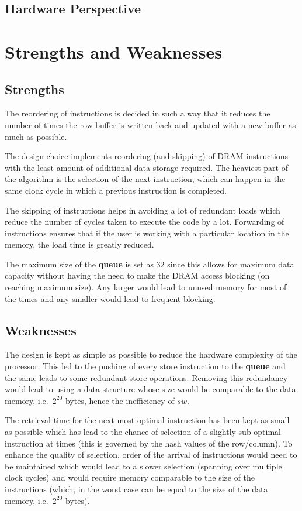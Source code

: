 \documentclass{article}
\begin{document}
\subsection{Hardware Perspective}


\section{Strengths and Weaknesses}


\subsection{Strengths}
The reordering of instructions is decided in such a way that it reduces the number of times the row buffer is written back and updated with a new buffer as much as possible.\par
The design choice implements reordering (and skipping) of DRAM instructions with the least amount of additional data storage required. The heaviest part of the algorithm is the selection of the next instruction, which can happen in the same clock cycle in which a previous instruction is completed.\par
The skipping of instructions helps in avoiding a lot of redundant loads which reduce the number of cycles taken to execute the code by a lot. Forwarding of instructions ensures that if the user is working with a particular location in the memory, the load time is greatly reduced.\par
The maximum size of the \textbf{queue} is set as $32$ since this allows for maximum data capacity without having the need to make the DRAM access blocking (on reaching maximum size). Any larger would lead to unused memory for most of the times and any smaller would lead to frequent blocking.

\subsection{Weaknesses}
The design is kept as simple as possible to reduce the hardware complexity of the processor. This led to the pushing of every store instruction to the \textbf{queue} and the same leads to some redundant store operations. Removing this redundancy would lead to using a data structure whose size would be comparable to the data memory, i.e.\ $2^{20}$ bytes, hence the inefficiency of $sw$.\par
The retrieval time for the next most optimal instruction has been kept as small as possible which has lead to the chance of selection of a slightly sub-optimal instruction at times (this is governed by the hash values of the row/column). To enhance the quality of selection, order of the arrival of instructions would need to be maintained which would lead to a slower selection (spanning over multiple clock cycles) and would require memory comparable to the size of the instructions (which, in the worst case can be equal to the size of the data memory, i.e.\ $2^{20}$ bytes).
\end{document}
